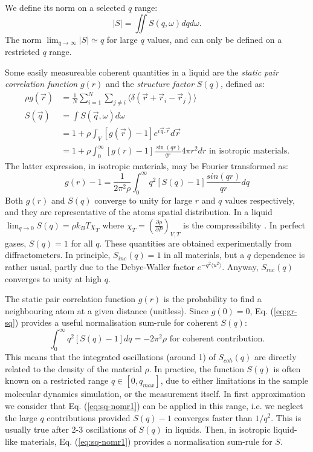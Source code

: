 We define its norm on a selected $q$ range:
\begin{equation}
|S| = \iint S(q,\omega) dq d\omega .
\end{equation}
The norm $\lim_{q \rightarrow \infty} |S| \simeq q$ for large $q$ values, and can only be defined on a restricted $q$ range.

Some easily measureable coherent quantities in a liquid are the \emph{static pair correlation function} $g(r)$ and the \emph{structure factor} $S(q)$, defined as:
\begin{equation}
  \label{eq:sq}
  \begin{aligned}
\rho g(\vec{r}) &=  \frac{1}{N} \sum_{i=1}^N \sum_{j \neq i} \langle \delta(\vec{r}+\vec{r}_i-\vec{r}_j) \rangle  \\
S(\vec{q}) &= \int S(\vec q,\omega) d\omega   \\
           &= 1 + \rho \int_V [g(\vec{r})-1] e^{i\vec{q}.\vec{r}} d\vec{r}  \\
           &= 1 + \rho \int_{0}^{\infty} [g(r)-1] \frac{\sin(qr)}{qr} 4 \pi r^2 dr \textrm{\ in\ isotropic\ materials.}
  \end{aligned}
\end{equation}
The latter expression, in isotropic materials, may be Fourier transformed as:
\begin{equation}
\label{eq:gr-sq}
g(r)-1 =\frac{1}{2\pi^2 \rho} \int_0^\infty q^2 [S(q) -1] \frac{sin(qr)}{qr} dq
\end{equation}
Both $g(r)$ and $S(q)$ converge to unity for large $r$ and $q$ values respectively, and they are representative of the atoms spatial distribution. In a liquid $\lim_{q \rightarrow 0} S(q) = \rho k_B T \chi_T$ where $\chi_T=(\frac{\partial \rho}{\partial P})_{V,T}$ is the compressibility \cite{Egelstaff67,fischer05}. In perfect gases, $S(q) = 1$ for all $q$. These quantities are obtained experimentally from diffractometers.
In principle, $S_{inc}(q) = 1$ in all materials, but a $q$ dependence is rather usual, partly due to the Debye-Waller factor $e^{-q^2 \langle u^2 \rangle}$. Anyway, $S_{inc}(q)$ converges to unity at high $q$.

The static pair correlation function $g(r)$ is the probability to find a neighbouring atom at a given distance (unitless). Since $g(0) = 0$, Eq. (\ref{eq:gr-sq}) provides a useful normalisation sum-rule for coherent $S(q)$:
\begin{equation}
\label{eq:sq-nomr1}
\int_0^\infty q^2 [S(q) - 1] dq = -2\pi^2\rho \textrm{\ for\ coherent\ contribution.}
\end{equation}
This means that the integrated oscillations (around 1) of $S_{coh}(q)$ are directly related to the density of the material $\rho$.
In practice, the function $S(q)$ is often known on a restricted range $q \in [0, q_{max} ]$, due to either limitations in the sample molecular dynamics simulation, or the measurement itself.
In first approximation we consider that Eq. (\ref{eq:sq-nomr1}) can be applied in this range, i.e. we neglect the large $q$ contributions provided $S(q)-1$ converges faster than $1/q^2$. This is usually true after 2-3 oscillations of $S(q)$ in liquids.
Then, in isotropic liquid-like materials, Eq. (\ref{eq:sq-nomr1}) provides a normalisation sum-rule for $S$.

